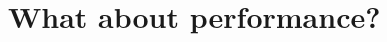 \documentclass[10pt, aspectratio=169, progressbar=frametitle]{beamer}
\begin{document}
\section{What about performance?}




\end{document}
